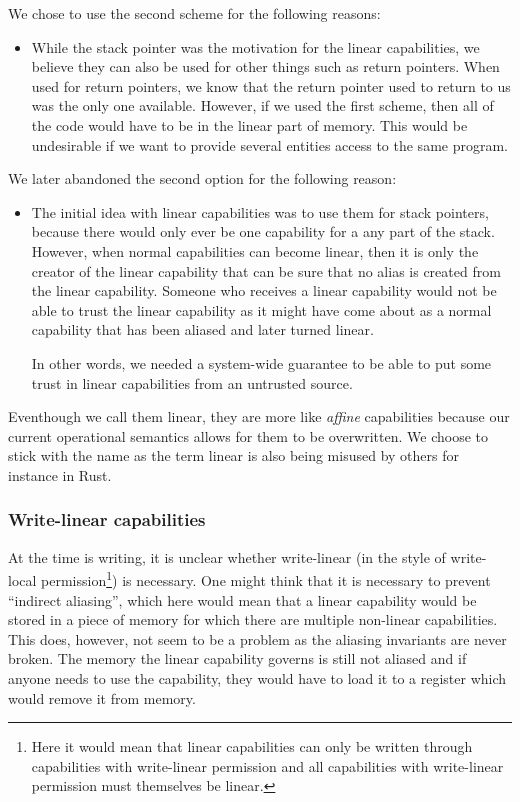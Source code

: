 \documentclass[a3paper]{article}
\begin{document}
We chose to use the second scheme for the following reasons:
\begin{itemize}
\item While the stack pointer was the motivation for the linear capabilities, we believe they can also be used for other things such as return pointers. When used for return pointers, we know that the return pointer used to return to us was the only one available. However, if we used the first scheme, then all of the code would have to be in the linear part of memory. This would be undesirable if we want to provide several entities access to the same program. 
\end{itemize}
We later abandoned the second option for the following reason:
\begin{itemize}
\item The initial idea with linear capabilities was to use them for stack pointers, because there would only ever be one capability for a any part of the stack. However, when normal capabilities can become linear, then it is only the creator of the linear capability that can be sure that no alias is created from the linear capability. Someone who receives a linear capability would not be able to trust the linear capability as it might have come about as a normal capability that has been aliased and later turned linear.

In other words, we needed a system-wide guarantee to be able to put some trust in linear capabilities from an untrusted source.
\end{itemize}

Eventhough we call them linear, they are more like \emph{affine} capabilities because our current operational semantics allows for them to be overwritten. We choose to stick with the name as the term linear is also being misused by others for instance in Rust.

\subsubsection{Write-linear capabilities}

At the time is writing, it is unclear whether write-linear (in the style of write-local permission\footnote{Here it would mean that linear capabilities can only be written through capabilities with write-linear permission and all capabilities with write-linear permission must themselves be linear.}) is necessary. One might think that it is necessary to prevent ``indirect aliasing'', which here would mean that a linear capability would be stored in a piece of memory for which there are multiple non-linear capabilities. This does, however, not seem to be a problem as the aliasing invariants are never broken. The memory the linear capability governs is still not aliased and if anyone needs to use the capability, they would have to load it to a register which would remove it from memory.
\end{document}
